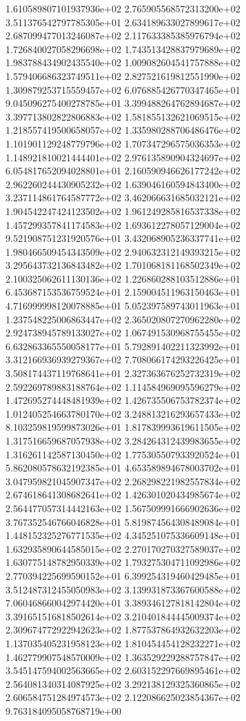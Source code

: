 1.610589807101937936e+02 2.765905568572313200e+02 3.511376542797785305e+01
2.634189633027899617e+02 2.687099477013246087e+02 2.117633385385976794e+02
1.726840027058296698e+02 1.743513428837979689e+02 1.983788434902435540e+02
1.009082604541757888e+02 1.579406686323749511e+02 2.827521619812551990e+02
1.309879253715559457e+02 6.076885426770347465e+01 9.045096275400278785e+01
3.399488264762894687e+02 3.397713802822806883e+02 1.581855132621069515e+02
1.218557419500658057e+02 1.335980288706486476e+02 1.101901129248779796e+02
1.707347296575036353e+02 1.148921810021444401e+02 2.976135890904324697e+02
6.054817652094028801e+01 2.160590946626177242e+02 2.962260244430905232e+02
1.639046160594843400e+02 3.237114861764587772e+02 3.462066631685032121e+02
1.904542247424123502e+02 1.961249285816537338e+02 1.457299357841174583e+02
1.693612278057129004e+02 9.521908751231920576e+01 3.432068905236337741e+02
1.980466509454343509e+02 2.940632312149393215e+02 3.295643732136843482e+02
1.701068181168502349e+02 2.100325062611130136e+02 1.226860288103512886e+01
6.453687153536759524e+01 2.159004511963150463e+01 4.716999998120078885e+01
5.052397589743011963e+01 1.237548225006863447e+02 2.365020807270962280e+02
2.924738945789133027e+02 1.067491530968755455e+02 6.632863365550058177e+01
5.792891402211323992e+01 3.312166936939279367e+02 7.708066174293226425e+01
3.508174437119768641e+01 2.327363676252732319e+02 2.592269789883188764e+02
1.114584969095596279e+02 1.472695274448481939e+02 1.426735506753782374e+02
1.012405254663780170e+02 3.248813216293657433e+02 8.103259819599873026e+01
1.817839993619611505e+02 1.317516659687057938e+02 3.284264312439983655e+02
1.316261142587130450e+02 1.775305507933920524e+01 5.862080578632192385e+01
4.653589894678003702e+01 3.047959821045907347e+02 2.268298221982557834e+02
2.674618641308682641e+02 1.426301020434985674e+02 2.564477057314442163e+02
1.567509991666902636e+02 3.767352546766046828e+01 5.819874564308489084e+01
1.448152325276771535e+02 4.345251075336609148e+01 1.632935890644585015e+02
2.270170270327589037e+02 1.630775148782950339e+02 1.793275304711092986e+02
2.770394225699590152e+01 6.399254319460429485e+01 3.512487312455050983e+02
3.139931873367600588e+02 7.060468660042974420e+01 3.389346127818142804e+02
3.391651516818502614e+02 3.210401844445009374e+02 2.309674772922942623e+02
1.877537864932632203e+02 1.137035405231958123e+02 1.810454454128232271e+02
1.462779907548570009e+02 1.363529229288757847e+02 3.545147594002563665e+02
2.603152297669895461e+02 2.564081340314087925e+02 3.292138129325360865e+02
2.606584751284974573e+02 2.122086625023854367e+02 9.763184095058768719e+00
